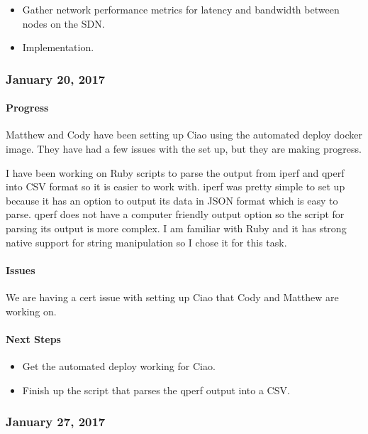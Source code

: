 \documentclass[10pt,onecolumn,journal,draftclsnofoot]{IEEEtran}
\begin{document}
\begin{itemize}
\item
  Gather network performance metrics for latency and bandwidth between
  nodes on the SDN.
\item
  Implementation.
\end{itemize}

\subsubsection{January 20, 2017} 

\paragraph{Progress} 

Matthew and Cody have been setting up Ciao using the automated deploy
docker image. They have had a few issues with the set up, but they are
making progress.

I have been working on Ruby scripts to parse the output from iperf and
qperf into CSV format so it is easier to work with. iperf was pretty
simple to set up because it has an option to output its data in JSON
format which is easy to parse. qperf does not have a computer friendly
output option so the script for parsing its output is more complex. I am
familiar with Ruby and it has strong native support for string
manipulation so I chose it for this task.

\paragraph{Issues} 

We are having a cert issue with setting up Ciao that Cody and Matthew
are working on.

\paragraph{Next Steps} 

\begin{itemize}
\item
  Get the automated deploy working for Ciao.
\item
  Finish up the script that parses the qperf output into a CSV.
\end{itemize}

\subsubsection{January 27, 2017} 
\end{document}
